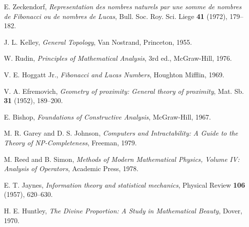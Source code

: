 \documentclass[12pt]{article}
\theoremstyle{plain}
\theoremstyle{definition}
\begin{document}
\begin{thebibliography}{99}

E. Zeckendorf, \textit{Representation des nombres naturels par une somme de nombres de Fibonacci ou de nombres de Lucas}, Bull. Soc. Roy. Sci. Liege \textbf{41} (1972), 179--182.

J. L. Kelley, \textit{General Topology}, Van Nostrand, Princeton, 1955.

W. Rudin, \textit{Principles of Mathematical Analysis}, 3rd ed., McGraw-Hill, 1976.

V. E. Hoggatt Jr., \textit{Fibonacci and Lucas Numbers}, Houghton Mifflin, 1969.

V. A. Efremovich, \textit{Geometry of proximity: General theory of proximity}, Mat. Sb. \textbf{31} (1952), 189--200.

E. Bishop, \textit{Foundations of Constructive Analysis}, McGraw-Hill, 1967.

M. R. Garey and D. S. Johnson, \textit{Computers and Intractability: A Guide to the Theory of NP-Completeness}, Freeman, 1979.

M. Reed and B. Simon, \textit{Methods of Modern Mathematical Physics, Volume IV: Analysis of Operators}, Academic Press, 1978.

E. T. Jaynes, \textit{Information theory and statistical mechanics}, Physical Review \textbf{106} (1957), 620--630.

H. E. Huntley, \textit{The Divine Proportion: A Study in Mathematical Beauty}, Dover, 1970.

\end{thebibliography}
\end{document}
